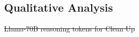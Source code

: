 \documentclass[11pt]{article}
\providecommand{\DIFdel}[1]{{\protect\color{red}\sout{#1}}}                      %
\providecommand{\DIFdelbegin}{} %
\providecommand{\DIFdelFL}[1]{\DIFdel{#1}} %
\newcommand{\DIFscaledelfig}{0.5}
\newlength{\DIFdelgraphicswidth} %
\newlength{\DIFdelgraphicsheight} %
\newcommand{\DIFdelincludegraphics}[2][]{%
\sbox{\DIFdelgraphicsbox}{\DIFOincludegraphics[#1]{#2}}%
\settoboxwidth{\DIFdelgraphicswidth}{\DIFdelgraphicsbox} %
\settoboxtotalheight{\DIFdelgraphicsheight}{\DIFdelgraphicsbox} %
\scalebox{\DIFscaledelfig}{%
\parbox[b]{\DIFdelgraphicswidth}{\usebox{\DIFdelgraphicsbox}\\[-\baselineskip] \rule{\DIFdelgraphicswidth}{0em}}\llap{\resizebox{\DIFdelgraphicswidth}{\DIFdelgraphicsheight}{%
\setlength{\unitlength}{\DIFdelgraphicswidth}%
\begin{picture}(1,1)%
\thicklines\linethickness{2pt} %
{\color[rgb]{1,0,0}\put(0,0){\framebox(1,1){}}}%
{\color[rgb]{1,0,0}\put(0,0){\line( 1,1){1}}}%
{\color[rgb]{1,0,0}\put(0,1){\line(1,-1){1}}}%
\end{picture}%
}\hspace*{3pt}}} %
} %
\DeclareRobustCommand{\DIFdelbegin}{\DIFOdelbegin \let\includegraphics\DIFdelincludegraphics} %
\begin{document}



\subsection{Qualitative Analysis}



\DIFdelbegin %

{%
\DIFdelFL{Llama-70B reasoning tokens for Clean Up}}

\end{document}
